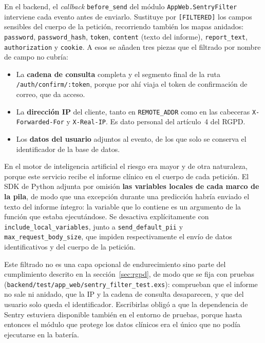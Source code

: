 En el backend, el \emph{callback} \texttt{before\_send} del módulo \texttt{AppWeb.SentryFilter} interviene cada evento antes de enviarlo. Sustituye por \texttt{[FILTERED]} los campos sensibles del cuerpo de la petición, recorriendo también los mapas anidados: \texttt{password}, \texttt{password\_hash}, \texttt{token}, \texttt{content} (texto del informe), \texttt{report\_text}, \texttt{authorization} y \texttt{cookie}. A esos se añaden tres piezas que el filtrado por nombre de campo no cubría:

\begin{itemize}
 \item La \textbf{cadena de consulta} completa y el segmento final de la ruta \texttt{/auth/\allowbreak{}confirm/\allowbreak{}:token}, porque por ahí viaja el token de confirmación de correo, que da acceso.
 \item La \textbf{dirección IP} del cliente, tanto en \texttt{REMOTE\_ADDR} como en las cabeceras \texttt{X-Forwarded-For} y \texttt{X-Real-IP}. Es dato personal del artículo~4 del RGPD.
 \item Los \textbf{datos del usuario} adjuntos al evento, de los que solo se conserva el identificador de la base de datos.
\end{itemize}

En el motor de inteligencia artificial el riesgo era mayor y de otra naturaleza, porque este servicio recibe el informe clínico en el cuerpo de cada petición. El SDK de Python adjunta por omisión \textbf{las variables locales de cada marco de la pila}, de modo que una excepción durante una predicción habría enviado el texto del informe íntegro: la variable que lo contiene es un argumento de la función que estaba ejecutándose. Se desactiva explícitamente con \texttt{include\_local\_variables}, junto a \texttt{send\_default\_pii} y \texttt{max\_request\_body\_size}, que impiden respectivamente el envío de datos identificativos y del cuerpo de la petición.

Este filtrado no es una capa opcional de endurecimiento sino parte del cumplimiento descrito en la sección~\ref{sec:rgpd}, de modo que se fija con pruebas (\texttt{backend/test/app\_web/sentry\_filter\_test.exs}): comprueban que el informe no sale ni anidado, que la IP y la cadena de consulta desaparecen, y que del usuario solo queda el identificador. Escribirlas obligó a que la dependencia de Sentry estuviera disponible también en el entorno de pruebas, porque hasta entonces el módulo que protege los datos clínicos era el único que no podía ejecutarse en la batería. 

